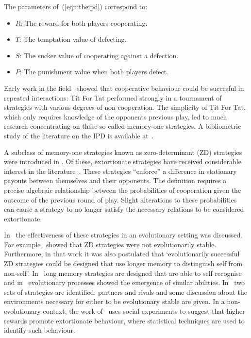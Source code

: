 \documentclass[a4paper]{article}
\begin{document}
The parameters of~(\ref{eqn:theipd}) correspond to:

\begin{itemize}
    \item \(R\): The reward for both players cooperating.
    \item \(T\): The temptation value of defecting.
    \item \(S\): The sucker value of cooperating against a defection.
    \item \(P\): The punishment value when both players defect.
\end{itemize}

Early work in the field~\cite{Axelrod1980, Axelrod1980a} showed that cooperative behaviour
could be succesful in repeated interactions: Tit For Tat performed
strongly in a tournament of strategies with various degrees of non-cooperation.
The simplicity of Tit For Tat, which only requires knowledge of the
opponents previous play, led to much research concentrating on these so called
memory-one strategies. A bibliometric study of the literature on the IPD is available
at~\cite{glynatsi2021bibliometric}.

A subclass of memory-one strategies known as zero-determinant (ZD) strategies
were introduced in \cite{Press2012}. Of these, extortionate strategies have received
considerable interest in the literature~\cite{hilbe2015partners}. These
strategies ``enforce'' a difference in stationary payouts between themselves and
their opponents. The definition requires a precise algebraic relationship
between the probabilities of cooperation given the outcome of the previous round
of play. Slight alterations to these probabilities can cause a strategy to no
longer satisfy the necessary relations to be considered extortionate.

In~\cite{adami2013evolutionary, hilbe2018partners, Hilbe2013, hilbe2013adaptive,
hilbe2015partners, ichinose2018zero, Moran1707} the effectiveness of these
strategies in an evolutionary setting was discussed. For
example~\cite{adami2013evolutionary} showed that ZD strategies were not
evolutionarily stable. Furthermore, in that work it was also postulated that
`evolutionarily successful ZD strategies could be designed that use longer
memory to distinguish self from non-self'. In~\cite{lee2015art} long memory
strategies are designed that are able to self recognise and in~\cite{Moran1707}
evolutionary processes showed the emergence of similar abilities.
In~\cite{hilbe2018partners} two sets of strategies are identified: partners and
rivals and some discussion about the environments necessary for either to be
evolutionary stable are given. In a non-evolutionary context, the work of~\cite{becks2019extortion} uses social
experiments to suggest that higher rewards promote extortionate
behaviour, where statistical techniques are used to identify such behaviour.
\end{document}
